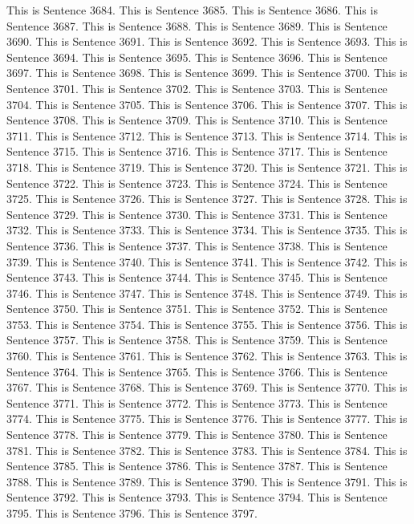 \documentclass{article}
\begin{document}
This is Sentence 3684.
This is Sentence 3685.
This is Sentence 3686.
This is Sentence 3687.
This is Sentence 3688.
This is Sentence 3689.
This is Sentence 3690.
This is Sentence 3691.
This is Sentence 3692.
This is Sentence 3693.
This is Sentence 3694.
This is Sentence 3695.
This is Sentence 3696.
This is Sentence 3697.
This is Sentence 3698.
This is Sentence 3699.
This is Sentence 3700.
This is Sentence 3701.
This is Sentence 3702.
This is Sentence 3703.
This is Sentence 3704.
This is Sentence 3705.
This is Sentence 3706.
This is Sentence 3707.
This is Sentence 3708.
This is Sentence 3709.
This is Sentence 3710.
This is Sentence 3711.
This is Sentence 3712.
This is Sentence 3713.
This is Sentence 3714.
This is Sentence 3715.
This is Sentence 3716.
This is Sentence 3717.
This is Sentence 3718.
This is Sentence 3719.
This is Sentence 3720.
This is Sentence 3721.
This is Sentence 3722.
This is Sentence 3723.
This is Sentence 3724.
This is Sentence 3725.
This is Sentence 3726.
This is Sentence 3727.
This is Sentence 3728.
This is Sentence 3729.
This is Sentence 3730.
This is Sentence 3731.
This is Sentence 3732.
This is Sentence 3733.
This is Sentence 3734.
This is Sentence 3735.
This is Sentence 3736.
This is Sentence 3737.
This is Sentence 3738.
This is Sentence 3739.
This is Sentence 3740.
This is Sentence 3741.
This is Sentence 3742.
This is Sentence 3743.
This is Sentence 3744.
This is Sentence 3745.
This is Sentence 3746.
This is Sentence 3747.
This is Sentence 3748.
This is Sentence 3749.
This is Sentence 3750.
This is Sentence 3751.
This is Sentence 3752.
This is Sentence 3753.
This is Sentence 3754.
This is Sentence 3755.
This is Sentence 3756.
This is Sentence 3757.
This is Sentence 3758.
This is Sentence 3759.
This is Sentence 3760.
This is Sentence 3761.
This is Sentence 3762.
This is Sentence 3763.
This is Sentence 3764.
This is Sentence 3765.
This is Sentence 3766.
This is Sentence 3767.
This is Sentence 3768.
This is Sentence 3769.
This is Sentence 3770.
This is Sentence 3771.
This is Sentence 3772.
This is Sentence 3773.
This is Sentence 3774.
This is Sentence 3775.
This is Sentence 3776.
This is Sentence 3777.
This is Sentence 3778.
This is Sentence 3779.
This is Sentence 3780.
This is Sentence 3781.
This is Sentence 3782.
This is Sentence 3783.
This is Sentence 3784.
This is Sentence 3785.
This is Sentence 3786.
This is Sentence 3787.
This is Sentence 3788.
This is Sentence 3789.
This is Sentence 3790.
This is Sentence 3791.
This is Sentence 3792.
This is Sentence 3793.
This is Sentence 3794.
This is Sentence 3795.
This is Sentence 3796.
This is Sentence 3797.
\end{document}
